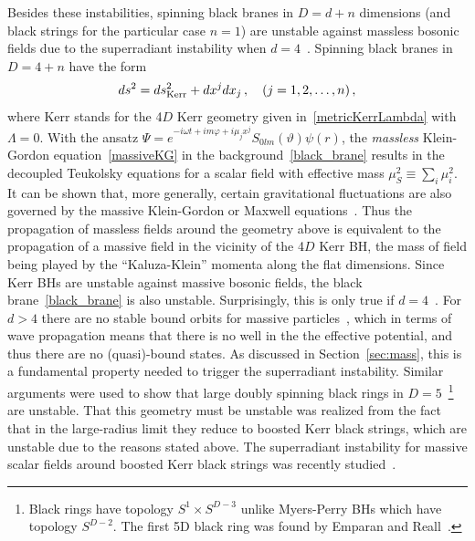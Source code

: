 \documentclass[11pt]{article}
\newcommand{\be}{\begin{equation}}
\newcommand{\ee}{\end{equation}}
\numberwithin{equation}{section} %
\begin{document}
Besides these instabilities, spinning black branes in $D=d+n$ dimensions (and black strings for the particular case $n=1$) are unstable against massless bosonic fields due to the superradiant instability when $d=4$~\cite{Cardoso:2004zz,Cardoso:2005vk,Ishibashi:2015rya}. Spinning black branes in $D=4+n$ have the form
%
\be\label{black_brane}
ds^2=ds^2_{\rm Kerr}+dx^jdx_j\,, \quad (j=1,2,\ldots,n)\,,
\ee
%
where Kerr stands for the 4$D$ Kerr geometry given in~\eqref{metricKerrLambda} with $\Lambda=0$. With the ansatz $\Psi=e^{-i\omega t+im\varphi+i\mu_jx^j}S_{0lm}(\vartheta)\psi(r)$,
the {\it massless} Klein-Gordon equation~\eqref{massiveKG} in the background~\eqref{black_brane} results in the decoupled Teukolsky equations for a scalar field with effective mass $\mu_S^2\equiv \sum_i \mu_i^2$. It can be shown that, more generally, certain gravitational fluctuations are also governed by the massive Klein-Gordon or Maxwell equations~\cite{Ishibashi:2015rya}.
Thus the propagation of  massless fields around the geometry above is equivalent to the propagation of a massive field in the vicinity of the 4$D$ Kerr BH, the mass of field being played by the ``Kaluza-Klein'' momenta along the flat dimensions. Since Kerr BHs are unstable against massive bosonic fields, the black brane~\eqref{black_brane} is also unstable. Surprisingly, this is only true if $d=4$~\cite{Cardoso:2005vk}. For $d>4$ there are no  stable bound orbits for massive particles~\cite{Cardoso:2008bp}, which in terms of wave propagation means that there is no well in the the effective potential, and thus there are no (quasi)-bound states. As discussed in Section~\ref{sec:mass}, this is a fundamental property needed to trigger the superradiant instability. Similar arguments were used to show that large doubly spinning black rings in $D=5$~\cite{Dias:2006zv}\footnote{Black rings have topology $S^1 \times S^{D-3}$ unlike Myers-Perry BHs which have topology $S^{D-2}$. The first 5D black ring was found by Emparan and Reall~\cite{Emparan:2001wn,Emparan:2006mm}.} are unstable. That this geometry must be unstable was realized from the fact that in the large-radius limit they reduce to boosted Kerr black strings, which are unstable due to the reasons stated above. The superradiant instability for massive scalar fields around boosted Kerr black strings was recently studied~\cite{Rosa:2012uz}.





\end{document}
